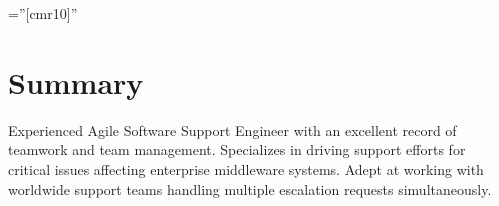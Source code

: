 \documentclass[a4paper,10pt]{article}
\begin{document}
\pagestyle{empty} %
\font\fb=''[cmr10]'' %

\par{\par}

 \smallskip
\section{Summary}

\begin{flushleft}
    \par{\normalsize{Experienced Agile Software Support Engineer with an excellent record of teamwork and team management. Specializes in driving support efforts for critical issues affecting enterprise middleware systems. Adept at working with worldwide support teams handling multiple escalation requests simultaneously.}
    }
\end{flushleft}

\end{document}
